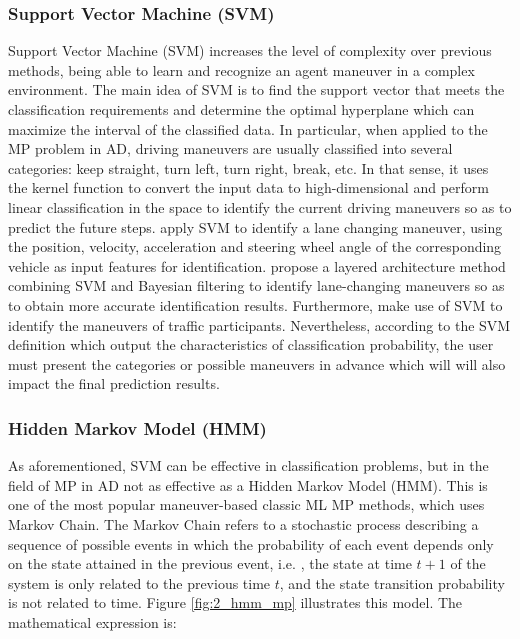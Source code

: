 \subsubsection{Support Vector Machine (SVM)}
\label{subsubsec:2_svm_mp}

Support Vector Machine (SVM) increases the level of complexity over previous methods, being able to learn and recognize an agent maneuver in a complex environment. The main idea of SVM is to find the support vector that meets the classification requirements and determine the optimal hyperplane which can maximize the interval of the classified data. In particular, when applied to the \ac{MP} problem in \ac{AD}, driving maneuvers are usually classified into several categories: keep straight, turn left, turn right, break, etc. In that sense, it uses the kernel function to convert the input data to high-dimensional and perform linear classification in the space to identify the current driving maneuvers so as to predict the future steps. \cite{mandalia2005using} apply SVM to identify a lane changing maneuver, using the position, velocity, acceleration and steering wheel angle of the corresponding vehicle as input features for identification. \cite{kumar2013learning} propose a layered architecture method combining SVM and Bayesian filtering to identify lane-changing maneuvers so as to obtain more accurate identification results. Furthermore, \cite{aoude2009using} make use of SVM to identify the maneuvers of traffic participants. Nevertheless, according to the SVM definition which output the characteristics of classification probability, the user must present the categories or possible maneuvers in advance which will will also impact the final prediction results.

\subsubsection{Hidden Markov Model (HMM)}
\label{subsubsec:2_hmm_mp}

As aforementioned, SVM can be effective in classification problems, but in the field of \ac{MP} in \ac{AD} not as effective as a Hidden Markov Model (HMM). This is one of the most popular maneuver-based classic ML \ac{MP} methods, which uses Markov Chain. The Markov Chain refers to a stochastic process describing a sequence of possible events in which the probability of each event depends only on the state attained in the previous event, i.e. , the state at time $t+1$ of the system is only related to the previous time $t$, and the state transition probability is not related to time. Figure \ref{fig:2_hmm_mp} illustrates this model. The mathematical expression is:


